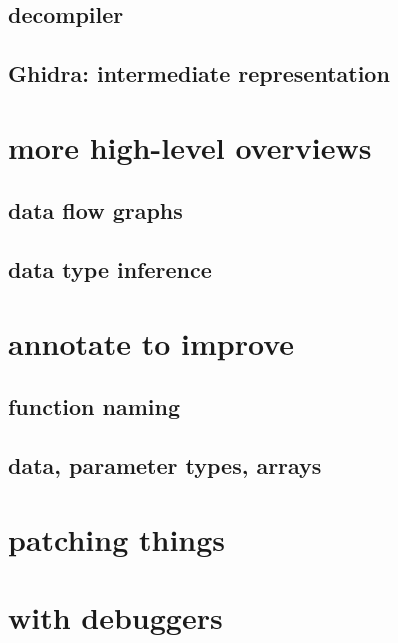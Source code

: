 \subsection{decompiler}


\subsection{Ghidra: intermediate representation}


\section{more high-level overviews}

\subsection{data flow graphs}

\subsection{data type inference}

\section{annotate to improve}

\subsection{function naming}

\subsection{data, parameter types, arrays}

\section{patching things}


\section{with debuggers}


